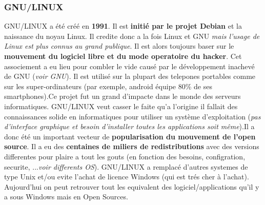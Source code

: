 \subsubsection{GNU/LINUX}

GNU/LINUX a été créé en \textbf{1991}. Il est \textbf{initié par le projet Debian} et la naissance du noyau Linux. Il credite donc a la fois Linux et GNU \textit{mais l'usage de Linux est plus connus au grand publique}. Il est alors toujours baser sur le \textbf{mouvement du logiciel libre et du mode operatoire du hacker}. 
Cet associement a eu lieu pour combler le vide causé par le développement inachevé de GNU (\textit{voir GNU}). Il est utilisé sur la plupart des telepones portables comme sur les super-ordinateurs (par exemple, android équipe 80\% de ses smartphones).Ce projet fut un grand d'impacte dans le monde des serveurs informatiques.
GNU/LINUX veut casser le faite qu'a l'origine il fallait des connaissances solide en informatiques pour utiliser un système d'exploitation (\textit{pas d'interface graphique et besoin d'installer toutes les applications soit même}).Il a donc été un important vecteur de \textbf{popularisation du mouvement de l'open source}.
Il a eu des \textbf{centaines de miliers de redistributions} avec des versions differentes pour plaire a tout les gouts (en fonction des besoins, configration, securite, ...\textit{voir differents OS}). GNU/LINUX a remplacé d'autres systemes de type Unix et/ou evite l'achat de licence Windows (qui est trés cher à l'achat). Aujourd'hui on peut retrouver tout les equivalent des logiciel/applications qu'il y a sous Windows mais en Open Sources.\newline
